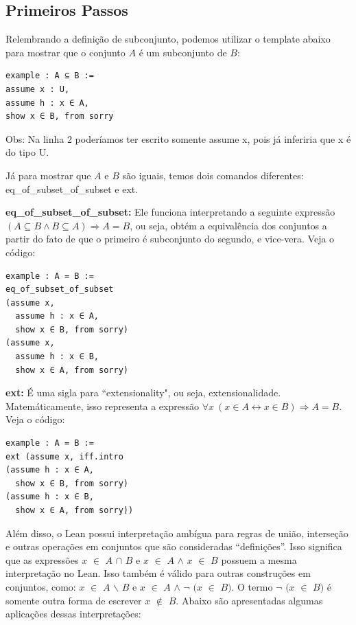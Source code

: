 \subsection{Primeiros Passos}

Relembrando a definição de subconjunto, podemos utilizar o template abaixo para mostrar que o conjunto $A$ é um subconjunto de $B$:

\begin{lstlisting}
example : A ⊆ B :=
assume x : U,
assume h : x ∈ A,
show x ∈ B, from sorry \end{lstlisting}

Obs: Na linha $2$ poderíamos ter escrito somente {\selectfont assume x}, pois já inferiria que {\selectfont x} é do tipo {\selectfont U}.

Já para mostrar que $A$ e $B$ são iguais, temos dois comandos diferentes: {\selectfont eq\_of\_subset\_of\_subset} e {\selectfont ext}.

\textbf{eq\_of\_subset\_of\_subset:} Ele funciona interpretando a seguinte expressão $(A \subseteq B \wedge B \subseteq A) \Rightarrow A=B$, ou seja, obtém a equivalência dos conjuntos a partir do fato de que o primeiro é subconjunto do segundo, e vice-vera. Veja o código:

\begin{lstlisting}
example : A = B :=
eq_of_subset_of_subset
(assume x,
  assume h : x ∈ A,
  show x ∈ B, from sorry)
(assume x,
  assume h : x ∈ B,
  show x ∈ A, from sorry) \end{lstlisting}

\textbf{ext:} É uma sigla para ``extensionality", ou seja, extensionalidade. Matemáticamente, isso representa a expressão $\forall x \ (x \in A \leftrightarrow x \in B) \Rightarrow A=B$. Veja o código:

\begin{lstlisting}
example : A = B :=
ext (assume x, iff.intro
(assume h : x ∈ A,
  show x ∈ B, from sorry)
(assume h : x ∈ B,
  show x ∈ A, from sorry)) \end{lstlisting}

Além disso, o Lean possui interpretação ambígua para regras de união, interseção e outras operações em conjuntos que são consideradas “definições”. Isso significa que as expressões $x$ $\in$ $A$ $\cap$ $B$ e $x$ $\in$ $A$ $\wedge$ $x$ $\in$ $B$ possuem a mesma interpretação no Lean. Isso também é válido para outras construções em conjuntos, como: $x$ $\in$ $A$ $\backslash $ $B$ e $x$ $\in$ $A$ $\wedge$ $\neg$ $(x$ $\in$ $B)$. O termo $\neg$ $(x$ $\in$ $B)$ é somente outra forma de escrever $x$ $\notin$ $B$. Abaixo são apresentadas algumas aplicações dessas interpretações:


